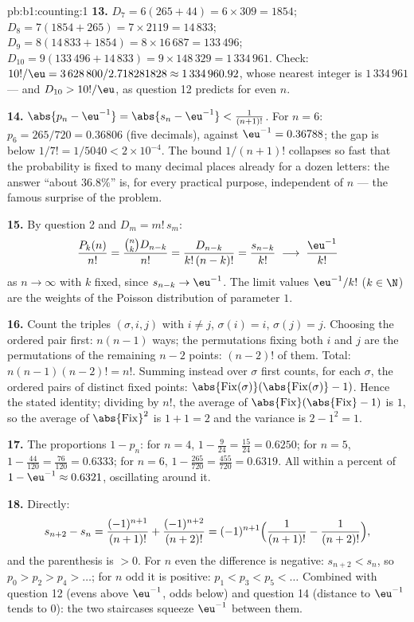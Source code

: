 \begin{solution}{pb:b1:counting:1}
\textbf{13.} $D_7 = 6(265 + 44) = 6 \times 309 = 1854$; $D_8 =
7(1854 + 265) = 7 \times 2119 = 14\,833$; $D_9 = 8(14\,833 + 1854)
= 8 \times 16\,687 = 133\,496$; $D_{10} = 9(133\,496 + 14\,833) =
9 \times 148\,329 = 1\,334\,961$. Check: $10!/\eu = 3\,628\,800 /
2.718281828 \approx 1\,334\,960.92$, whose nearest integer is
$1\,334\,961$ --- and $D_{10} > 10!/\eu$, as question 12 predicts
for even $n$.

\textbf{14.} $\abs{p_n - \eu^{-1}} = \abs{s_n - \eu^{-1}} <
\frac1{(n+1)!}$. For $n = 6$: $p_6 = 265/720 = 0.36806$ (five
decimals), against $\eu^{-1} = 0.36788$; the gap is below $1/7! =
1/5040 < 2 \times 10^{-4}$. The bound $1/(n+1)!$ collapses so fast
that the probability is fixed to many decimal places already for a
dozen letters: the answer ``about $36.8\%$'' is, for every
practical purpose, independent of $n$ --- the famous surprise of
the problem.

\textbf{15.} By question 2 and $D_m = m!\,s_m$:
\[
\frac{P_k(n)}{n!} = \frac{\binom nk D_{n-k}}{n!}
= \frac{D_{n-k}}{k!\,(n-k)!} = \frac{s_{n-k}}{k!}
\;\longrightarrow\; \frac{\eu^{-1}}{k!}
\]
as $n \to \infty$ with $k$ fixed, since $s_{n-k} \to \eu^{-1}$.
The limit values $\eu^{-1}/k!$ ($k \in \N$) are the weights of the
Poisson distribution of parameter $1$.

\textbf{16.} Count the triples $(\sigma, i, j)$ with $i \neq j$,
$\sigma(i) = i$, $\sigma(j) = j$. Choosing the ordered pair first:
$n(n-1)$ ways; the permutations fixing both $i$ and $j$ are the
permutations of the remaining $n - 2$ points: $(n-2)!$ of them.
Total: $n(n-1)(n-2)! = n!$. Summing instead over $\sigma$ first
counts, for each $\sigma$, the ordered pairs of distinct fixed
points: $\abs{\mathrm{Fix}(\sigma)}(\abs{\mathrm{Fix}(\sigma)}-1)$.
Hence the stated identity; dividing by $n!$, the average of
$\abs{\mathrm{Fix}}(\abs{\mathrm{Fix}} - 1)$ is $1$, so the average
of $\abs{\mathrm{Fix}}^2$ is $1 + 1 = 2$ and the variance is $2 -
1^2 = 1$.

\textbf{17.} The proportions $1 - p_n$: for $n = 4$, $1 - \frac
9{24} = \frac{15}{24} = 0.6250$; for $n = 5$, $1 - \frac{44}{120} =
\frac{76}{120} = 0.6333$; for $n = 6$, $1 - \frac{265}{720} =
\frac{455}{720} = 0.6319$. All within a percent of $1 - \eu^{-1}
\approx 0.6321$, oscillating around it.

\textbf{18.} Directly:
\[
s_{n+2} - s_n = \frac{(-1)^{n+1}}{(n+1)!} +
\frac{(-1)^{n+2}}{(n+2)!}
= (-1)^{n+1}\Bigl(\frac1{(n+1)!} - \frac1{(n+2)!}\Bigr),
\]
and the parenthesis is $> 0$. For $n$ even the difference is
negative: $s_{n+2} < s_n$, so $p_0 > p_2 > p_4 > \dots$; for $n$
odd it is positive: $p_1 < p_3 < p_5 < \dots$ Combined with
question 12 (evens above $\eu^{-1}$, odds below) and question 14
(distance to $\eu^{-1}$ tends to $0$): the two staircases squeeze
$\eu^{-1}$ between them.


\end{solution}
